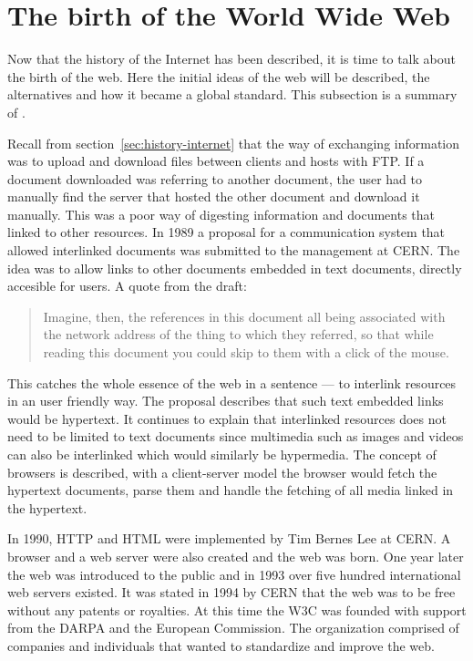   \section{The birth of the World Wide Web}\label{sec:www}
    Now that the history of the Internet has been described, it is time to talk about the birth of the web.
    Here the initial ideas of the \gls{web} will be described, the alternatives and how it became a global standard.
    This subsection is a summary of .

    Recall from section~\ref{sec:history-internet} that the way of exchanging information was to upload and download files between clients and hosts with \gls{FTP}.
    If a \gls{document} downloaded was referring to another \gls{document}, the user had to manually find the server that hosted the other \gls{document} and download it manually.
    This was a poor way of digesting information and \glspl{document} that linked to other resources.
    In 1989 a proposal for a communication system that allowed interlinked \glspl{document} was submitted to the management at \gls{CERN}.
    The idea was to allow links to other \glspl{document} embedded in text \glspl{document}, directly accesible for users.
    A quote from the draft:
    \begin{quote}
      Imagine, then, the references in this \gls{document} all being associated with the network address of the thing to which they referred, so that while reading this \gls{document} you could skip to them with a click of the mouse.
    \end{quote}
    This catches the whole essence of the \gls{web} in a sentence --- to interlink resources in an user friendly way.
    The proposal describes that such text embedded links would be \gls{hypertext}.
    It continues to explain that interlinked resources does not need to be limited to text \glspl{document} since multimedia such as images and videos can also be interlinked which would similarly be hypermedia.
    The concept of \glspl{browser} is described, with a client-server model the \gls{browser} would fetch the \gls{hypertext} \glspl{document}, parse them and handle the fetching of all media linked in the \gls{hypertext}.

    In 1990, \gls{HTTP} and \gls{HTML} were implemented by Tim Bernes Lee at \gls{CERN}.
    A \gls{browser} and a \gls{web} server were also created and the \gls{web} was born.
    One year later the \gls{web} was introduced to the public and in 1993 over five hundred international \gls{web} servers existed.
    It was stated in 1994 by \gls{CERN} that the \gls{web} was to be free without any patents or royalties.
    At this time the \gls{W3C} was founded with support from the \gls{DARPA} and the European Commission.
    The organization comprised of companies and individuals that wanted to standardize and improve the \gls{web}.

